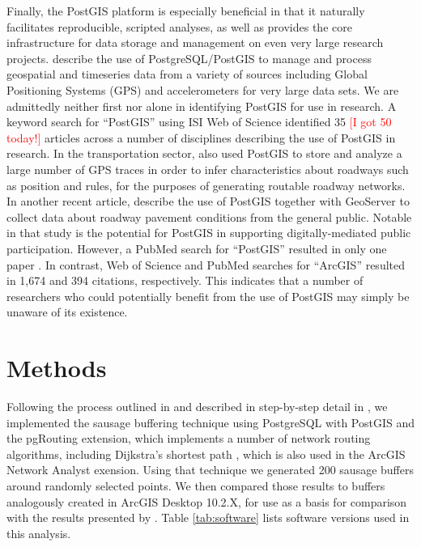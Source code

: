 \documentclass[11pt,letterpaper]{article} %
\begin{document}
Finally, the PostGIS platform is especially beneficial in that it
naturally facilitates reproducible, scripted analyses, as well as 
provides the core infrastructure for data storage and management on even very large research
projects. \textcite{hurvitz2014emerging} describe the use of
PostgreSQL/PostGIS to manage and process geospatial and timeseries
data from a variety of sources including Global Positioning Systems (GPS) and
accelerometers for very large data sets. We are admittedly neither first nor alone in identifying
PostGIS for use in research. A keyword search for ``PostGIS'' using
ISI Web of Science identified 35 \textcolor{red}{[I got 50 today!]} articles across a number of
disciplines describing the use of PostGIS in research. In the
transportation sector, \textcite{Wang2015routable} also used PostGIS
to store and analyze a large number of GPS traces in order to infer
characteristics about roadways such as position and rules, for the
purposes of generating routable roadway networks. In another recent
article, \textcite{Brovelli2015FOSS} describe the use of PostGIS
together with GeoServer to collect data about roadway pavement
conditions from the general public. Notable in that study is the
potential for PostGIS in supporting digitally-mediated public
participation. However, a PubMed search for ``PostGIS'' resulted in only one paper \parencite{Rowlingson2013}. In contrast, Web of Science and PubMed searches for ``ArcGIS'' resulted in 1,674 and 394 citations, respectively. This indicates that a number of researchers who could potentially benefit from the use of PostGIS may simply be unaware of its existence.


\section*{Methods}
Following the process outlined in 
\textcite{Forsyth2014sausage} and described in step-by-step detail in \textcite{ Forsyth2012proto}, we implemented the
sausage buffering technique using PostgreSQL 
with PostGIS and the pgRouting \parencite{pgRoutingContributors2013} extension, which implements a number of network routing algorithms, including Dijkstra's shortest path \parencite{Dijkstra1959}, which is also used in the ArcGIS Network Analyst exension. Using that technique we
generated 200 sausage buffers around randomly selected points. We then
compared those results to buffers analogously created in ArcGIS Desktop
10.2.X, for use as a basis for comparison with the results presented
by \citeauthor{Forsyth2014sausage}. Table \ref{tab:software} lists
software versions used in this analysis.
\end{document}
